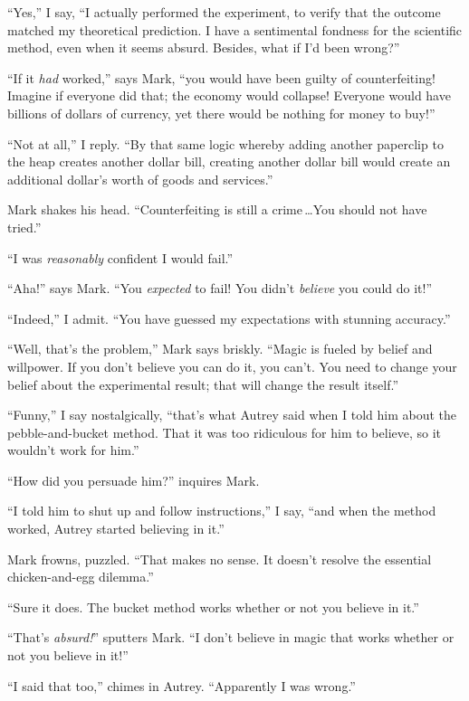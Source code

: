 {
 ``Yes,'' I say,
``I actually performed the experiment, to verify that
the outcome matched my theoretical prediction. I have a sentimental
fondness for the scientific method, even when it seems absurd. Besides,
what if I'd been wrong?''}

{
 ``If it \textit{had} worked,''
says Mark, ``you would have been guilty of
counterfeiting! Imagine if everyone did that; the economy would
collapse! Everyone would have billions of dollars of currency, yet
there would be nothing for money to buy!''}

{
 ``Not at all,'' I reply.
``By that same logic whereby adding another paperclip
to the heap creates another dollar bill, creating another dollar bill
would create an additional dollar's worth of goods and
services.''}

{
 Mark shakes his head. ``Counterfeiting is still a
crime\,\ldots You should not have tried.''}

{
 ``I was \textit{reasonably} confident I would
fail.''}

{
 ``Aha!'' says Mark.
``You \textit{expected} to fail! You
didn't \textit{believe} you could do
it!''}

{
 ``Indeed,'' I admit.
``You have guessed my expectations with stunning
accuracy.''}

{
 ``Well, that's the
problem,'' Mark says briskly.
``Magic is fueled by belief and willpower. If you
don't believe you can do it, you can't.
You need to change your belief about the experimental result; that will
change the result itself.''}

{
 ``Funny,'' I say nostalgically,
``that's what Autrey said when I told
him about the pebble-and-bucket method. That it was too ridiculous for
him to believe, so it wouldn't work for
him.''}

{
 ``How did you persuade him?''
inquires Mark.}

{
 ``I told him to shut up and follow
instructions,'' I say, ``and when
the method worked, Autrey started believing in it.''}

{
 Mark frowns, puzzled. ``That makes no sense. It
doesn't resolve the essential chicken-and-egg
dilemma.''}

{
 ``Sure it does. The bucket method works whether
or not you believe in it.''}

{
 ``That's
\textit{absurd!}'' sputters Mark.
``I don't believe in magic that works
whether or not you believe in it!''}

{
 ``I said that too,'' chimes in
Autrey. ``Apparently I was wrong.''}

